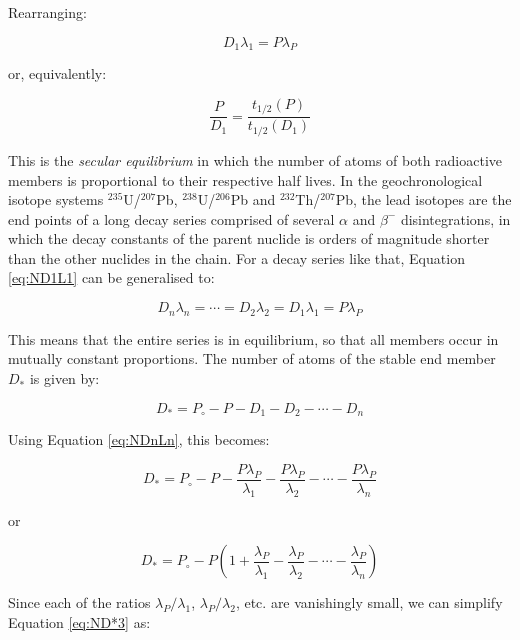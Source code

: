 \documentclass{book}
\begin{document}
Rearranging:

\begin{equation}
D_1 \lambda_1 = P \lambda_P
\label{eq:ND1L1}
\end{equation}

or, equivalently:

\begin{equation}
\frac{P}{D_1} = \frac{t_{1/2}(P)}{t_{1/2}(D_1)}
\label{eq:NPND1}
\end{equation}

This is the \emph{secular equilibrium} in which the number of atoms of
both radioactive members is proportional to their respective half
lives. In the geochronological isotope systems $^{235}$U/$^{207}$Pb,
$^{238}$U/$^{206}$Pb and $^{232}$Th/$^{207}$Pb, the lead isotopes are
the end points of a long decay series comprised of several $\alpha$
and $\beta^-$ disintegrations, in which the decay constants of the
parent nuclide is orders of magnitude shorter than the other nuclides
in the chain. For a decay series like that, Equation \ref{eq:ND1L1}
can be generalised to:

\begin{equation}
D_n \lambda_n = \cdots  = D_2 \lambda_2 = D_1 \lambda_1 = P \lambda_P
\label{eq:NDnLn}
\end{equation}

This means that the entire series is in equilibrium, so that all
members occur in mutually constant proportions. The number of atoms of
the stable end member $D_*$ is given by:

\begin{equation}
D_* = P_\circ - P - D_1 - D_2 - \cdots - D_n
\label{eq:ND*}
\end{equation}

Using Equation \ref{eq:NDnLn}, this becomes:

\begin{equation}
D_* = P_\circ - P - \frac{P \lambda_P}{\lambda_1} - 
\frac{P \lambda_P}{\lambda_2} - \cdots - \frac{P \lambda_P}{\lambda_n}
\label{eq:ND*2}
\end{equation}

or

\begin{equation}
D_* = P_\circ - P \left( 1 + \frac{\lambda_P}{\lambda_1} - 
\frac{\lambda_P}{\lambda_2} - \cdots - \frac{\lambda_P}{\lambda_n}\right)
\label{eq:ND*3}
\end{equation}

Since each of the ratios $\lambda_P/\lambda_1$, $\lambda_P/\lambda_2$,
etc.  are vanishingly small, we can simplify Equation \ref{eq:ND*3}
as:
\end{document}
